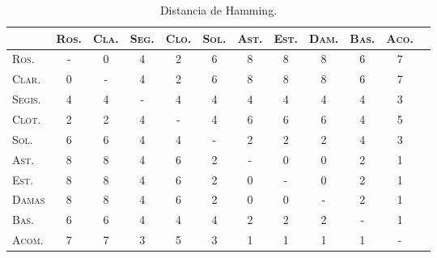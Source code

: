 \begin{table}[!ht]
	\centering\footnotesize
	\begin{tabular}{lccccccccccc}
		\toprule
		&\textsc{Ros.} & \textsc{Cla.}& \textsc{Seg.}& \textsc{Clo.}& \textsc{Sol.}& \textsc{Ast.}& \textsc{Est.}& \textsc{Dam.}& \textsc{Bas.}&  \textsc{Aco.} \\
		\midrule
		\textsc{Ros.}	& - & 0 & 4 & 2 & 6 & 8 & 8 & 8 & 6 & 7   \\
		\textsc{Clar.}	& 0 & - & 4 & 2 & 6 & 8 & 8 & 8 & 6 & 7   \\
		\textsc{Segis.}	& 4 & 4 & - & 4 & 4 & 4 & 4 & 4 & 4 & 3   \\
		\textsc{Clot.}	& 2 & 2 & 4	& - & 4 & 6 & 6 & 6 & 4 & 5   \\
		\textsc{Sol.}	& 6 & 6 & 4 & 4 & - & 2 & 2 & 2 & 4 & 3   \\
		\textsc{Ast.}	& 8 & 8 & 4 & 6 & 2 & - & 0 & 0 & 2 & 1   \\
		\textsc{Est.}	& 8 & 8 & 4 & 6 & 2 & 0 & - & 0 & 2 & 1   \\
		\textsc{Damas}	& 8 & 8 & 4 & 6 & 2 & 0 & 0 & - & 2 & 1   \\
		\textsc{Bas.}	& 6 & 6 & 4 & 4 & 4 & 2 & 2 & 2 & - & 1   \\
		\textsc{Acom.}	& 7 & 7 & 3 & 5 & 3 & 1 & 1 & 1 & 1 & -   \\
		\bottomrule
	\end{tabular}
	\caption{Distancia de Hamming.}
	\label{tab:hamming}
\end{table}
